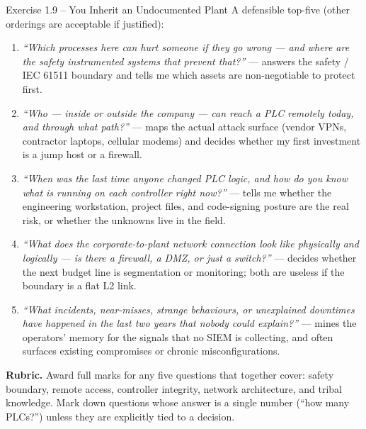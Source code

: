 \documentclass[11pt,a4paper]{article}
\begin{document}
\begin{solutionbox}{Exercise 1.9 -- You Inherit an Undocumented Plant}
A defensible top-five (other orderings are acceptable if justified):
\begin{enumerate}
  \item \emph{``Which processes here can hurt someone if they go wrong --- and where are the safety instrumented systems that prevent that?''} --- answers the safety / IEC 61511 boundary and tells me which assets are non-negotiable to protect first.
  \item \emph{``Who --- inside or outside the company --- can reach a PLC remotely today, and through what path?''} --- maps the actual attack surface (vendor VPNs, contractor laptops, cellular modems) and decides whether my first investment is a jump host or a firewall.
  \item \emph{``When was the last time anyone changed PLC logic, and how do you know what is running on each controller right now?''} --- tells me whether the engineering workstation, project files, and code-signing posture are the real risk, or whether the unknowns live in the field.
  \item \emph{``What does the corporate-to-plant network connection look like physically and logically --- is there a firewall, a DMZ, or just a switch?''} --- decides whether the next budget line is segmentation or monitoring; both are useless if the boundary is a flat L2 link.
  \item \emph{``What incidents, near-misses, strange behaviours, or unexplained downtimes have happened in the last two years that nobody could explain?''} --- mines the operators' memory for the signals that no SIEM is collecting, and often surfaces existing compromises or chronic misconfigurations.
\end{enumerate}

\textbf{Rubric.} Award full marks for any five questions that together cover: safety boundary, remote access, controller integrity, network architecture, and tribal knowledge. Mark down questions whose answer is a single number (``how many PLCs?'') unless they are explicitly tied to a decision.
\end{solutionbox}
\end{document}

